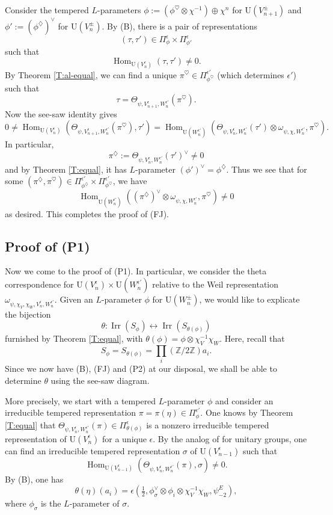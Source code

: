 \documentclass[11pt]{amsart}
\numberwithin{equation}{section}
\theoremstyle{plain}
\theoremstyle{definition}
\theoremstyle{remark}
\def\Hom{\operatorname{Hom}}
\def\Irr{\operatorname{Irr}}
\def\U{\mathrm{U}}
\def\ZZ{\mathbb{Z}}
\begin{document}
Consider the tempered $L$-parameters $\phi:= (\phi^{\heartsuit} \otimes \chi^{-1}) \oplus \chi^n$ for $\U(V_{n+1}^{\pm})$ and $\phi' := (\phi^{\diamondsuit})^{\vee}$ for $\U(V_n^{\pm})$. By (B), there is a pair of representations
\[  (\tau  , \tau') \in \Pi^{\epsilon}_{\phi} \times \Pi^{\epsilon}_{\phi'}  \]
such that
\[  \Hom_{\U(V_n^{\epsilon})}( \tau, \tau')  \ne 0. \]
By Theorem \ref{T:al-equal}, we can find a unique $\pi^{\heartsuit} \in \Pi^{\epsilon'}_{\phi^{\heartsuit}}$ (which determines $\epsilon'$) such that
\[ \tau   = \Theta_{\psi, V^{\epsilon}_{n+1}, W^{\epsilon'}_n}( \pi^{\heartsuit}  ). \]
Now the see-saw identity gives
\[   0 \ne \Hom_{\U(V_n^{\epsilon})}(  \Theta_{\psi, V^{\epsilon}_{n+1},  W^{\epsilon'}_n}( \pi^{\heartsuit}),  \tau')
 = \Hom_{\U(W_n^{\epsilon'})} (\Theta_{\psi, V_n^{\epsilon}, W_n^{\epsilon'}}(\tau') \otimes \omega_{\psi, \chi, W_n^{\epsilon'}}, \pi^{\heartsuit}). \]
In particular, 
 \[  \pi^{\diamondsuit} := \Theta_{\psi, V_n^{\epsilon}, W_n^{\epsilon'}}(\tau')^{\vee} \ne 0 \]
and by Theorem \ref{T:equal}, it has $L$-parameter $(\phi')^\vee = \phi^{\diamondsuit}$. Thus we see that for some $(\pi^{\diamondsuit}, \pi^{\heartsuit})  \in \Pi^{\epsilon'}_{\phi^{\diamondsuit}} \times \Pi^{\epsilon'}_{\phi^{\heartsuit}}$, we have
\[
 \Hom_{\U(W^{\epsilon'}_n)} ( (\pi^{\diamondsuit})^{\vee} \otimes \omega_{\psi,\chi, W_n^{\epsilon'}} ,  \pi^{\heartsuit}) \ne 0 
\]
as desired. This completes the proof of (FJ).
 
\subsection{Proof of (P1)}

Now we come to the proof of (P1). In particular, we consider the theta correspondence for $\U(V_n^\epsilon) \times \U(W_n^{\epsilon'})$ relative to the Weil representation $\omega_{\psi, \chi_V, \chi_W, V_n^{\epsilon}, W_n^{\epsilon'}}$. Given an $L$-parameter $\phi$ for $\U(W_n^{\pm})$, we would like to explicate the bijection
\[  \theta:  \Irr(S_{\phi}) \longleftrightarrow \Irr(S_{\theta(\phi)}) \]
furnished by Theorem \ref{T:equal}, with $\theta(\phi) = \phi \otimes \chi_V^{-1} \chi_W$.
Here, recall that
\[  S_{\phi}  = S_{\theta(\phi)}    = \prod_i  (\ZZ / 2 \ZZ) a_i. \]
Since we now have (B), (FJ) and (P2) at our disposal, we shall be able to determine $\theta$ using the see-saw diagram.

More precisely, we start with a tempered $L$-parameter $\phi$ and consider an irreducible tempered representation $\pi = \pi(\eta) \in \Pi_{\phi}^{\epsilon'}$.
One knows by Theorem \ref{T:equal} that $\Theta_{\psi, V^{\epsilon}_n, W_n^{\epsilon'}}(\pi) \in \Pi_{\theta(\phi)}^{\epsilon}$ is a nonzero irreducible tempered representation of $\U(V_n^\epsilon)$ for a unique $\epsilon$. 
By the analog of \cite[Lemma 12.5]{gs} for unitary groups, one can find an irreducible tempered representation $\sigma$ of $\U(V_{n-1}^{\epsilon})$ such that
\[  \Hom_{\U(V_{n-1}^{\epsilon})}(\Theta_{\psi, V^{\epsilon}_n, W_n^{\epsilon'}}(\pi), \sigma)  \ne 0. \]
By (B),  one has
\[   \theta(\eta)(a_i)  =  \epsilon(\tfrac{1}{2}, \phi_{\sigma}^{\vee} \otimes  \phi_i \otimes \chi_V^{-1} \chi_W,  \psi^E_{-2}),   \]
where $\phi_\sigma$ is the $L$-parameter of $\sigma$.
\end{document}

